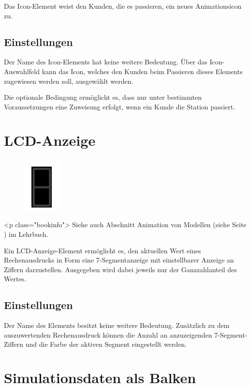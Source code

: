 Das Icon-Element weist den Kunden, die es passieren, ein neues Animationsicon zu.

\subsection*{Einstellungen}

Der Name des Icon-Elements hat keine weitere Bedeutung. Über das Icon-Auswahlfeld kann das Icon,
welches den Kunden beim Passieren dieses Elements zugewiesen werden soll, ausgewählt werden.

Die optionale Bedingung ermöglicht es, dass nur unter bestimmten Voraussetzungen eine Zuweisung erfolgt,
wenn ein Kunde die Station passiert.


\section{LCD-Anzeige}
\label{ref:ModelElementAnimationLCD}

\begin{figure}
\vspace{-22pt}
\includegraphics[width=2cm]{imageModelElementAnimationLCD.png}
\vspace{-22pt}
\end{figure}

<p class="bookinfo">
Siehe auch Abschnitt Animation von Modellen (siehe Seite \pageref{ref:book:5.4.3}) im Lehrbuch.

Ein LCD-Anzeige-Element ermöglicht es, den aktuellen Wert eines Rechenausdrucks
in Form eine 7-Segmentanzeige mit einstellbarer Anzeige an Ziffern darzustellen.
Ausgegeben wird dabei jeweils nur der Ganzzahlanteil des Wertes.

\subsection*{Einstellungen}

Der Name des Elements besitzt keine weitere Bedeutung.
Zusätzlich zu dem auszuwertenden Rechenausdruck können
die Anzahl an anzuzeigenden 7-Segment-Ziffern und die
Farbe der aktiven Segment eingestellt werden.


\section{Simulationsdaten als Balken}
\label{ref:ModelElementAnimationBar}

